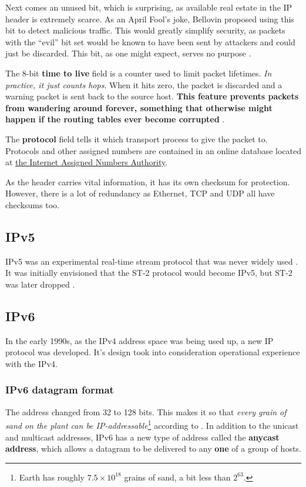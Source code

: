 \documentclass[12pt, oneside]{book}
\begin{document}
Next comes an unused bit, which is surprising, as available real estate in the IP header is extremely scarce.
As an April Fool's joke, Bellovin proposed using this bit to detect malicious traffic.
This would greatly simplify security, as packets with the ``evil'' bit set would be known to have been sent by attackers and could just be discarded.
This bit, as one might expect, serves no purpose \cite{computer-networks-tanenbaum-2012}.

The 8-bit \textbf{time to live} field is a counter used to limit packet lifetimes.
\textit{In practice, it just counts hops}.
When it hits zero, the packet is discarded and a warning packet is sent back to the source host.
\textbf{This feature prevents packets from wandering around forever, something that otherwise might happen if the routing tables ever become corrupted} \cite{computer-networks-tanenbaum-2012}.

The \textbf{protocol} field tells it which transport process to give the packet to.
Protocols and other assigned numbers are contained in an online database located at \href{https://www.iana.org}{the Internet Assigned Numbers Authority}.

As the header carries vital information, it has its own checksum for protection. However, there is a lot of redundancy as Ethernet, TCP and UDP all have checksums too.

\subsection{IPv5}

IPv5 was an experimental real-time stream protocol that was never widely used \cite{communication-networks-leon-garcia-2000}.
It was initially envisioned that the ST-2 protocol would become IPv5, but ST-2 was later dropped \cite{computer-networking-kurose-2012}.

\subsection{IPv6}
In the early 1990s, as the IPv4 address space was being used up, a new IP protocol was developed.
It's design took into consideration operational experience with the IPv4.

\subsubsection{IPv6 datagram format}

The address changed from 32 to 128 bits.
This makes it so that \textit{every grain of sand on the plant can be IP-addressable}\footnote{Earth has roughly \(7.5 \times 10^{18}\) grains of sand, a bit less than \(2^{63}\).} according to \cite{computer-networking-kurose-2012}.
In addition to the unicast and multicast addresses, IPv6 has a new type of address called the \textbf{anycast address}, which allows a datagram to be delivered to any \textbf{one} of a group of hosts.
\end{document}
